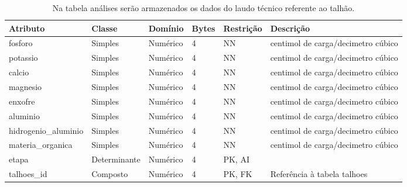 \begin{landscape}
    \begin{table}[H]
        \centering
        \caption[Tabela análises]{Na tabela análises serão armazenados os dados do laudo técnico referente ao talhão.
            \label{tab:tabela-er-analises}}
        \begin{tabular}{|p{4cm}|p{3cm}|p{2cm}|p{1cm}|p{2cm}|p{8cm}|}
            \hline
            Atributo             & Classe       & Domínio  & Bytes & Restrição & Descrição                          \\\hline
            fosforo              & Simples      & Numérico & 4     & NN        & centimol de carga/decimetro cúbico \\\hline
            potassio             & Simples      & Numérico & 4     & NN        & centimol de carga/decimetro cúbico \\\hline
            calcio               & Simples      & Numérico & 4     & NN        & centimol de carga/decimetro cúbico \\\hline
            magnesio             & Simples      & Numérico & 4     & NN        & centimol de carga/decimetro cúbico \\\hline
            enxofre              & Simples      & Numérico & 4     & NN        & centimol de carga/decimetro cúbico \\\hline
            aluminio             & Simples      & Numérico & 4     & NN        & centimol de carga/decimetro cúbico \\\hline
            hidrogenio\_aluminio & Simples      & Numérico & 4     & NN        & centimol de carga/decimetro cúbico \\\hline
            materia\_organica    & Simples      & Numérico & 4     & NN        & centimol de carga/decimetro cúbico \\\hline
            etapa                & Determinante & Numérico & 4     & PK, AI    &                                    \\\hline
            talhoes\_id          & Composto     & Numérico & 4     & PK, FK    & Referência à tabela talhoes        \\\hline
        \end{tabular}
    \end{table}

    \label{sec:titSubSecCorrecoes}


\end{landscape}
